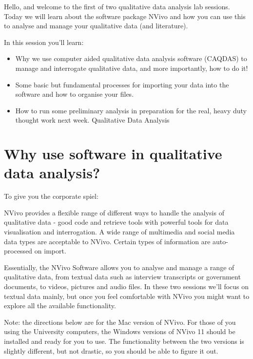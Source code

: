 \documentclass[]{book}
\providecommand{\tightlist}{%
  \setlength{\itemsep}{0pt}\setlength{\parskip}{0pt}}
\theoremstyle{definition}
\theoremstyle{definition}
\theoremstyle{definition}
\theoremstyle{remark}
\begin{document}
Hello, and welcome to the first of two qualitative data analysis lab
sessions. Today we will learn about the software package NVivo and how
you can use this to analyse and manage your qualitative data (and
literature).

In this session you'll learn:

\begin{itemize}
\tightlist
\item
  Why we use computer aided qualitative data analysis software (CAQDAS)
  to manage and interrogate qualitative data, and more importantly, how
  to do it!
\item
  Some basic but fundamental processes for importing your data into the
  software and how to organise your files.
\item
  How to run some preliminary analysis in preparation for the real,
  heavy duty thought work next week. Qualitative Data Analysis
\end{itemize}

\hypertarget{why-use-software-in-qualitative-data-analysis}{%
\section{Why use software in qualitative data
analysis?}\label{why-use-software-in-qualitative-data-analysis}}

To give you the corporate spiel:

NVivo provides a flexible range of different ways to handle the analysis
of qualitative data - good code and retrieve tools with powerful tools
for data visualisation and interrogation. A wide range of multimedia and
social media data types are acceptable to NVivo. Certain types of
information are auto-processed on import.

Essentially, the NVivo Software allows you to analyse and manage a range
of qualitative data, from textual data such as interview transcripts or
government documents, to videos, pictures and audio files. In these two
sessions we'll focus on textual data mainly, but once you feel
comfortable with NVivo you might want to explore all the available
functionality.

Note: the directions below are for the Mac version of NVivo. For those
of you using the University computers, the Windows versions of NVivo 11
should be installed and ready for you to use. The functionality between
the two versions is slightly different, but not drastic, so you should
be able to figure it out.
\end{document}

